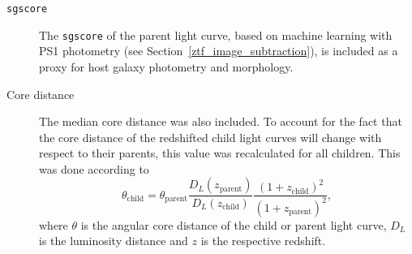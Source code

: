 \begin{description}
    \item[\texttt{sgscore}] The \texttt{sgscore} of the parent light curve, based on machine learning with PS1 photometry (see Section~\ref{ztf_image_subtraction}), is included as a proxy for host galaxy photometry and morphology.
    \item[Core distance] The median core distance was also included. To account for the fact that the core distance of the redshifted child light curves will change with respect to their parents, this value was recalculated for all children. This was done according to
        \begin{equation}
            \theta_\text{child} = \theta_\text{parent} \frac{D_L(z_\text{parent})}{D_L(z_\text{child})} \frac{(1+z_\text{child})^2}{(1+z_\text{parent})^2},
        \end{equation}
        where $\theta$ is the angular core distance of the child or parent light curve, $D_L$ is the luminosity distance and $z$ is the respective redshift.
\end{description}